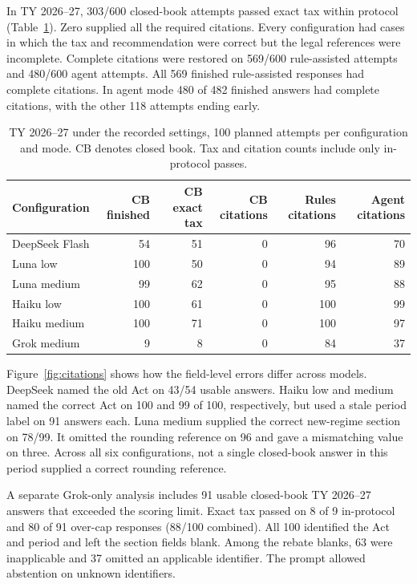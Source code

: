 \documentclass[10pt,letterpaper,twocolumn]{article}
\begin{document}
In TY 2026--27, 303/600 closed-book attempts passed exact tax within protocol (Table~\ref{tab:transition}). Zero supplied all the required citations. Every configuration had cases in which the tax and recommendation were correct but the legal references were incomplete. Complete citations were restored on 569/600 rule-assisted attempts and 480/600 agent attempts. All 569 finished rule-assisted responses had complete citations. In agent mode 480 of 482 finished answers had complete citations, with the other 118 attempts ending early.

\begin{table}[!tb]
  \centering\small
  \setlength{\tabcolsep}{5pt}
  \caption{TY 2026--27 under the recorded settings, 100 planned attempts per configuration and mode. CB denotes closed book. Tax and citation counts include only in-protocol passes.}
  \label{tab:transition}
  \begin{tabular*}{\textwidth}{@{\extracolsep{\fill}}lrrrrr@{}}
    \toprule
    \textbf{Configuration} & \textbf{CB finished} & \textbf{CB exact tax} & \textbf{CB citations} & \textbf{Rules citations} & \textbf{Agent citations} \\
    \midrule
    DeepSeek Flash & 54 & 51 & 0 & 96 & 70 \\
    Luna low & 100 & 50 & 0 & 94 & 89 \\
    Luna medium & 99 & 62 & 0 & 95 & 88 \\
    Haiku low & 100 & 61 & 0 & 100 & 99 \\
    Haiku medium & 100 & 71 & 0 & 100 & 97 \\
    Grok medium & 9 & 8 & 0 & 84 & 37 \\
    \bottomrule
  \end{tabular*}
\end{table}

Figure~\ref{fig:citations} shows how the field-level errors differ across models. DeepSeek named the old Act on 43/54 usable answers. Haiku low and medium named the correct Act on 100 and 99 of 100, respectively, but used a stale period label on 91 answers each. Luna medium supplied the correct new-regime section on 78/99. It omitted the rounding reference on 96 and gave a mismatching value on three. Across all six configurations, not a single closed-book answer in this period supplied a correct rounding reference.

A separate Grok-only analysis includes 91 usable closed-book TY 2026--27 answers that exceeded the scoring limit. Exact tax passed on 8 of 9 in-protocol and 80 of 91 over-cap responses (88/100 combined). All 100 identified the Act and period and left the section fields blank. Among the rebate blanks, 63 were inapplicable and 37 omitted an applicable identifier. The prompt allowed abstention on unknown identifiers.
\end{document}
